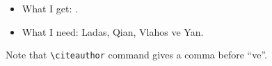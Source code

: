 \documentclass[10pt]{beamer}
\begin{document}
\begin{frame}

\begin{itemize}
\item What I get: \citeauthor{MR1103855}.
\item What I need: Ladas, Qian, Vlahos ve Yan.
\end{itemize}
\alert{Note that \texttt{{\textbackslash}citeauthor} command gives a comma before {\textquotedblleft}ve{\textquotedblright}.}

\printbibliography

\end{frame}
\end{document}

